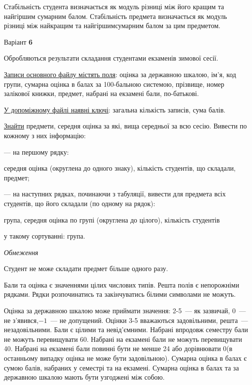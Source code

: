 \documentclass[11pt, ukrainian]{article}
\begin{document}
Стабільність студента визначається як модуль різниці між його кращим та найгіршим сумарним балом.
Стабільність предмета визначається як модуль різниці між найкращим та найгіршимсумарним балом за цим предметом.




\par
\newpage
{\center Варіант  \No \textbf { 6 }\par}
\bigskip
Обробляються результати складання студентами екзаменів зимової сесії.

\underline{Записи основного файлу містять поля}: оцінка за державною шкалою, ім’я, код групи, сумарна оцінка в балах за 100-бальною системою, прізвище, номер залікової книжки, предмет, набрані на екзамені бали, по-батькові.

\underline{У допоміжному файлі наявні ключі}: загальна кількість записів, сума балів.

\underline{Знайти} предмети, середня оцінка за які, вища середньої за всю сесію. Вивести по кожному з них інформацію:\par
{\noindent}--- на першому рядку:\par
середня оцінка (округлена до одного знаку), кількість студентів, що складали, предмет;

{\noindent}--- на наступних рядках, починаючи з табуляції, вивести для предмета всіх студентів, що його складали (по одному на рядок):\par
група, середня оцінка по групі (округлена до цілого), кількість студентів

{\noindent}у такому сортуванні: група.


\bigskip\textit{Обмеження}

Студент не може складати предмет більше одного разу.

Бали та оцінка є значеннями цілих числових типів. Решта полів є непорожніми рядками.
Рядки розпочинатись та закінчуватись білими символами не можуть.

Оцінка за державною шкалою може приймати значення: 2-5~--- як зазвичай, 0~--- не з’явився,$-1$~--- не допущений. 
Оцінки 3-5 вважаються задовільними, решта~--- незадовільними. 
Бали є цілими та невід’ємними.
Набрані впродовж семестру бали не можуть перевищувати 60. 
Набрані на екзамені бали не можуть перевищувати 40. 
Набрані на екзамені бали повинні бути не менше 24 або дорівнювати 0(в останньому випадку оцінка не може бути задовільною). 
Сумарна оцінка в балах є сумою балів, набраних у семестрі та на екзамені.
Сумарна оцінка в балах та за державною шкалою мають бути узгоджені між собою.
\end{document}
